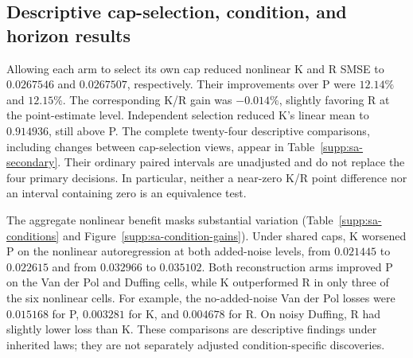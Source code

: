 \begin{table}[t]
\centering\small
\caption{Complete D aggregates for the representation-only ablation.
SMSE is averaged over horizons, then equally over the six nonlinear or
two linear law/noise cells within each repetition. SD is across the
\SARepetitions\ complete repetitions, not a confidence interval.
The independent-cap view is secondary.}
\label{supp:sa-aggregate}

\end{table}

\begin{table}[t]
\centering\small
\caption{All four primary shared-cap comparisons. Gain is
$100(1-\overline L_{\mathrm{candidate}}/
\overline L_{\mathrm{reference}})$.
The margin-adjusted difference and its simultaneous one-sided upper
bound are in absolute SMSE units, not percentages. The factors are
$0.97$ for nonlinear superiority (sup.) and $1.05$ for linear
noninferiority (NI); a criterion is met only when its upper bound is
strictly negative. The four bounds use Equation~\eqref{eq:supp-sa-primary}.}
\label{supp:sa-primary}

\end{table}

\FloatBarrier
\subsection{Descriptive cap-selection, condition, and horizon results}

Allowing each arm to select its own cap reduced nonlinear K and R
SMSE to $0.0267546$ and $0.0267507$, respectively. Their improvements
over P were $12.14\%$ and $12.15\%$. The corresponding K/R gain was
$-0.014\%$, slightly favoring R at the point-estimate level. Independent
selection reduced K's linear mean to $0.914936$, still above P.
The complete twenty-four descriptive comparisons, including changes
between cap-selection views, appear in Table~\ref{supp:sa-secondary}.
Their ordinary paired intervals are unadjusted and do not replace the
four primary decisions. In particular, neither a near-zero K/R point
difference nor an interval containing zero is an equivalence test.

The aggregate nonlinear benefit masks substantial variation
(Table~\ref{supp:sa-conditions} and Figure~\ref{supp:sa-condition-gains}).
Under shared caps, K worsened P on the nonlinear autoregression at
both added-noise levels, from $0.021445$ to $0.022615$ and from
$0.032966$ to $0.035102$. Both reconstruction arms improved P on
the Van der Pol and Duffing cells, while K outperformed R in only
three of the six nonlinear cells. For example, the no-added-noise
Van der Pol losses were $0.015168$ for P, $0.003281$ for K, and
$0.004678$ for R. On noisy Duffing, R had slightly lower loss than K.
These comparisons are descriptive findings under inherited laws;
they are not separately adjusted condition-specific discoveries.

